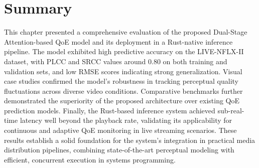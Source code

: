 \section*{Summary}

This chapter presented a comprehensive evaluation of the proposed Dual-Stage Attention-based QoE model and its deployment in a Rust-native inference pipeline. 
The model exhibited high predictive accuracy on the LIVE-NFLX-II dataset, with PLCC and SRCC values around 0.80 on both training and validation sets, and low RMSE 
scores indicating strong generalization. Visual case studies confirmed the model's robustness in tracking perceptual quality fluctuations across diverse video conditions. 
Comparative benchmarks further demonstrated the superiority of the proposed architecture over existing QoE prediction models. 
Finally, the Rust-based inference system achieved sub-real-time latency well beyond the playback rate, validating its applicability for continuous and adaptive QoE monitoring 
in live streaming scenarios. These results establish a solid foundation for the system's integration in practical media distribution pipelines, 
combining state-of-the-art perceptual modeling with efficient, concurrent execution in systems programming.
